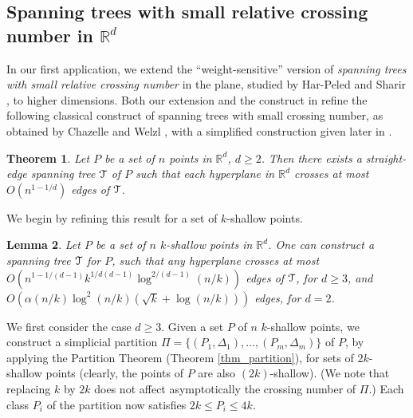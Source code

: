 \documentclass[11pt]{article}
\newtheorem{theorem}{Theorem}[section]
\newtheorem{lemma}[theorem]{Lemma}
\newcommand{\Tree}{\EuScript{T}}
\def\reals{\mathbb R}
\begin{document}
\subsection{Spanning trees with small relative crossing number in $\reals^d$} \label{subsection_spanning_tree}

In our first application, we extend the ``weight-sensitive'' version of \emph{spanning trees with small relative crossing number} in the plane, studied by Har-Peled and Sharir \cite{hs11}, to higher dimensions. Both our extension and the construct in \cite{hs11} refine the following classical construct of spanning trees with small crossing number, as obtained by Chazelle and Welzl \cite{cw89}, with a simplified construction given later in \cite{wel92}.

\begin{theorem} \emph{{\bf\cite{cw89, wel92}}} \label{thm_standard_spanning_T}
Let $P$ be a set of $n$ points in $\reals^{d}$, $d \geq 2$. Then there exists a straight-edge spanning tree $\Tree$ of $P$ such that each hyperplane in $\reals^{d}$ crosses at most $O(n^{1-1/d})$ edges of $\Tree$.
\end{theorem}


We begin by refining this result for a set of $k$-shallow points.

\begin{lemma} \label{lemma_spanning_T_k}
Let $P$ be a set of $n$ $k$-shallow points in $\reals^{d}$. One can construct a spanning tree $\EuScript{T}$ for $P$, such that any hyperplane crosses at most $O\left(n^{1-1/(d-1)}k^{1/d(d-1)}\log^{2/(d-1)}(n/k)\right)$ edges of $\Tree$, for $d \geq 3$, and  $O\left(\alpha(n/k)\log^{2}(n/k)\left(\sqrt{k} + \log(n/k)\right)\right)$ edges, for $d = 2$.
\end{lemma}

 We first consider the case $d \geq 3$. Given a set $P$ of $n$ $k$-shallow points, we construct a simplicial partition $\Pi = \{(P_{1},\Delta_{1}), \ldots,(P_{m},\Delta_{m})\}$ of $P$, by applying the Partition Theorem (Theorem \ref{thm_partition}), for sets of $2k$-shallow points (clearly, the points of $P$ are also $(2k)$-shallow). (We note that replacing $k$ by $2k$ does not affect asymptotically the crossing number of $\Pi$.) Each class $P_{i}$ of the partition now satisfies $2k \leq P_{i} \leq 4k$.
\end{document}

